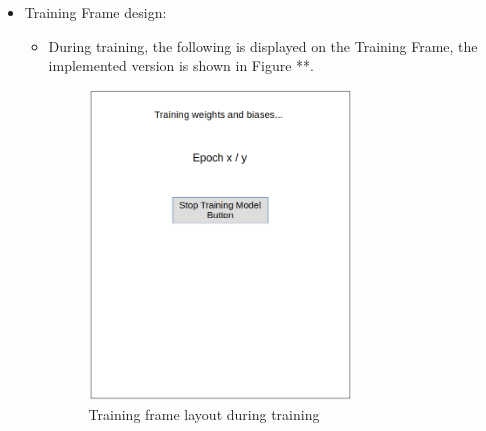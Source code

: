 \documentclass[./project-report/src/latex/project-report.tex]{subfiles}
\begin{document}
\begin{itemize}
    \pagebreak

    \item Training Frame design: 
        \begin{itemize}
            \item During training, the following is displayed on the Training Frame, the implemented version is shown in Figure **.
                \begin{figure}[h!]
                \centering
                \includegraphics[width=0.7\textwidth]{./project-report/src/images/training-frame-1-design.png}
                \caption{Training frame layout during training}
                \label{fig:training-frame-1-design}
                \end{figure}

            \pagebreak


\end{itemize}
\end{itemize}
\end{document}

